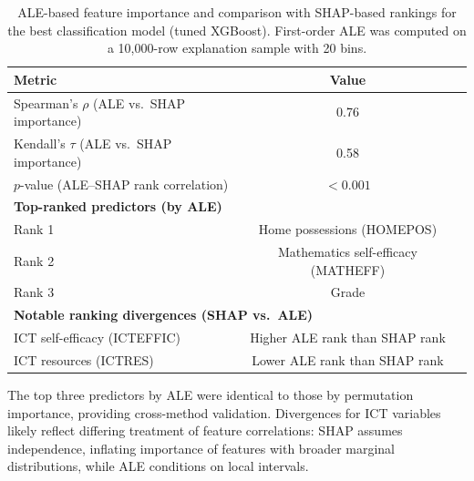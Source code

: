 \begin{table}[htp]
\centering
\caption{ALE-based feature importance and comparison with SHAP-based rankings for the best classification model (tuned XGBoost). First-order ALE was computed on a 10,000-row explanation sample with 20 bins.}
\label{tab:ale-summaries}
\begin{tabular}{lcc}
\toprule
Metric & Value \\
\midrule
Spearman's $\rho$ (ALE vs.\ SHAP importance) & 0.76 \\
Kendall's $\tau$ (ALE vs.\ SHAP importance) & 0.58 \\
$p$-value (ALE--SHAP rank correlation) & $<0.001$ \\
\midrule
\multicolumn{2}{l}{\textbf{Top-ranked predictors (by ALE)}} \\
Rank 1 & Home possessions (HOMEPOS) \\
Rank 2 & Mathematics self-efficacy (MATHEFF) \\
Rank 3 & Grade \\
\midrule
\multicolumn{2}{l}{\textbf{Notable ranking divergences (SHAP vs.\ ALE)}} \\
ICT self-efficacy (ICTEFFIC) & Higher ALE rank than SHAP rank \\
ICT resources (ICTRES) & Lower ALE rank than SHAP rank \\
\bottomrule
\end{tabular}

\par\small\raggedright The top three predictors by ALE were identical to those by permutation importance, providing cross-method validation. Divergences for ICT variables likely reflect differing treatment of feature correlations: SHAP assumes independence, inflating importance of features with broader marginal distributions, while ALE conditions on local intervals.
\end{table}
